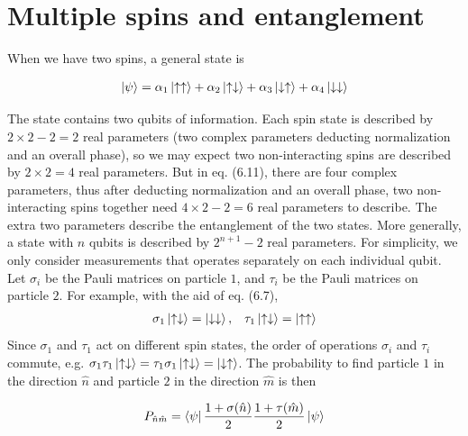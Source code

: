 \documentclass[12pt]{book} %
\numberwithin{equation}{chapter}
\def\a{\alpha}
\def\s{\sigma}
\def\t{\tau}
\begin{document}
\section{Multiple spins and entanglement}
When we have two spins, a general state is
\begin{eqnbox}
\begin{align}
\ket{\psi}=\a_{1}\ket{\uparrow\uparrow}+\a_{2}\ket{\uparrow\downarrow}+\a_{3}\ket{\downarrow\uparrow}+\a_{4}\ket{\downarrow\downarrow}
\end{align}
\end{eqnbox}
The state contains two qubits of information.\bigskip\newline
Each spin state is described by $2\times2-2=2$ real parameters (two complex parameters deducting normalization and an overall phase), so we may expect two non-interacting spins are described by $2\times2=4$ real parameters. But in eq. (6.11), there are four complex parameters, thus after deducting normalization and an overall phase, two non-interacting spins together need $4\times2-2=6$ real parameters to describe. The extra two parameters describe the entanglement of the two states.\bigskip\newline
More generally, a state with $n$ qubits is described by $2^{n+1}-2$ real parameters.\bigskip\newline
For simplicity, we only consider measurements that operates separately on each individual qubit. Let $\s_{i}$ be the Pauli matrices on particle $1$, and $\t_{i}$ be the Pauli matrices on particle $2$. For example, with the aid of eq. (6.7),
\begin{align*}
\s_{1}\ket{\uparrow\downarrow}=\ket{\downarrow\downarrow}, \,\,\,\,\,\t_{1}\ket{\uparrow\downarrow}=\ket{\uparrow\uparrow}
\end{align*}
Since $\s_{1}$ and $\t_{1}$ act on different spin states, the order of operations $\s_{i}$ and $\t_{i}$ commute, e.g. $\s_{1}\t_{1}\ket{\uparrow\downarrow}=\t_{1}\s_{1}\ket{\uparrow\downarrow}=\ket{\downarrow\uparrow}$.\bigskip\newline
The probability to find particle $1$ in the direction $\hat{n}$ and particle $2$ in the direction $\hat{m}$ is then
\begin{eqnbox}
\begin{align}
P_{\hat{n}\hat{m}}=\bra{\psi}\frac{1+\s(\hat{n})}{2}\frac{1+\t(\hat{m})}{2}\ket{\psi}
\end{align}
\end{eqnbox}
\end{document}
